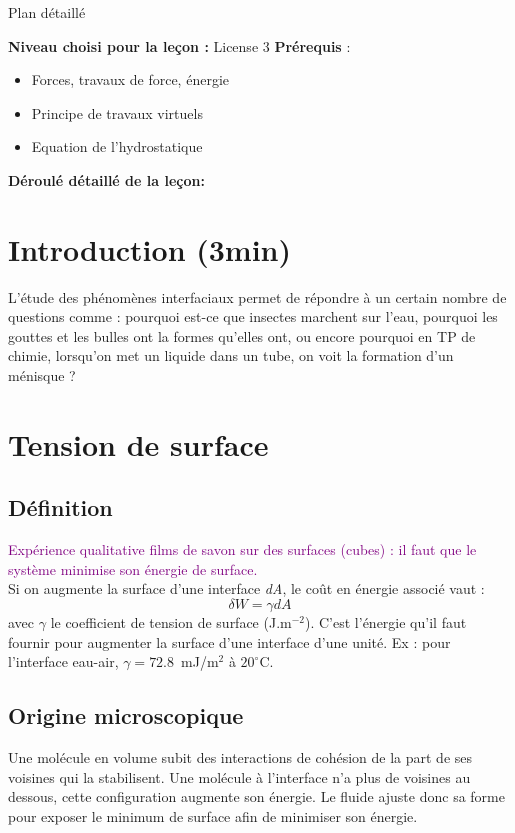 \begin{reportBlock}{Plan détaillé}

  \textbf{Niveau choisi pour la leçon :} License 3
  \newline
  \textbf{Prérequis} : \begin{itemize}
      \item Forces, travaux de force, énergie
      \item Principe de travaux virtuels
      \item Equation de l'hydrostatique
  \end{itemize}

  
  \textbf{Déroulé détaillé de la leçon: }   \newline
  
  \section*{Introduction (3min)}
L'étude des phénomènes interfaciaux permet de répondre à un certain nombre de questions comme : pourquoi est-ce que insectes marchent sur l'eau, pourquoi les gouttes et les bulles ont la formes qu'elles ont, ou encore pourquoi en TP de chimie, lorsqu'on met un liquide dans un tube, on voit la formation d'un ménisque ?
  \section{Tension de surface}
  \subsection{Définition}
  \textcolor{purple}{Expérience qualitative films de savon sur des surfaces (cubes) : il faut que le système minimise son énergie de surface.}\\
  Si on augmente la surface d'une interface \textit{dA}, le coût en énergie associé vaut : 
  \begin{equation}
      \delta W = \gamma dA
  \end{equation}
  avec $\gamma$ le coefficient de tension de surface (J.m$^{-2}$). C'est l'énergie qu'il faut fournir pour augmenter la surface d'une interface d'une unité. Ex : pour l'interface eau-air, $\gamma = 72.8$~mJ/m$^2$ à $20^{\circ}$C. 
  
  \subsection{Origine microscopique}
  Une molécule en volume subit des interactions de cohésion de la part de ses voisines qui la stabilisent. Une molécule à l'interface n'a plus de voisines au dessous, cette configuration augmente son énergie. Le fluide ajuste donc sa forme pour exposer le minimum de surface afin de minimiser son énergie.


\end{reportBlock}
